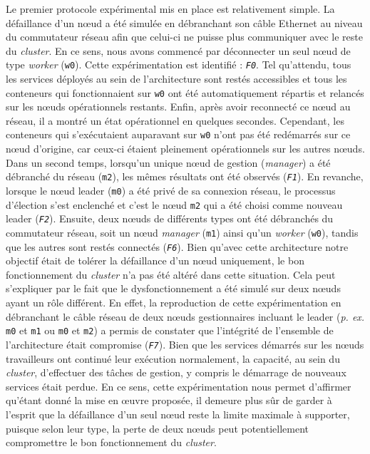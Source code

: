 Le premier protocole expérimental mis en place est relativement simple. La défaillance d'un n\oe{}ud a été simulée en débranchant son câble Ethernet au niveau du commutateur réseau afin que celui-ci ne puisse plus communiquer avec le reste du \textit{cluster}. En ce sens, nous avons commencé par déconnecter un seul n\oe{}ud de type \textit{worker} (\texttt{w0}). Cette expérimentation est identifié : \textit{\texttt{F0}}. Tel qu'attendu, tous les services déployés au sein de l'architecture sont restés accessibles et tous les conteneurs qui fonctionnaient sur \texttt{w0} ont été automatiquement répartis et relancés sur les n\oe{}uds opérationnels restants. Enfin, après avoir reconnecté ce n\oe{}ud au réseau, il a montré un état opérationnel en quelques secondes. Cependant, les conteneurs qui s'exécutaient auparavant sur \texttt{w0} n'ont pas été redémarrés sur ce n\oe{}ud d'origine, car ceux-ci étaient pleinement opérationnels sur les autres n\oe{}uds. Dans un second temps, lorsqu'un unique n\oe{}ud de gestion (\textit{manager}) a été débranché du réseau (\texttt{m2}), les mêmes résultats ont été observés (\textit{\texttt{F1}}). En revanche, lorsque le n\oe{}ud leader (\texttt{m0}) a été privé de sa connexion réseau, le processus d'élection s'est enclenché et c'est le n\oe{}ud \texttt{m2} qui a été choisi comme nouveau leader (\textit{\texttt{F2}}). Ensuite, deux n\oe{}uds de différents types ont été débranchés du commutateur réseau, soit un n\oe{}ud \textit{manager} (\texttt{m1}) ainsi qu'un \textit{worker} (\texttt{w0}), tandis que les autres sont restés connectés (\textit{\texttt{F6}}). Bien qu'avec cette architecture notre objectif était de tolérer la défaillance d'un n\oe{}ud uniquement, le bon fonctionnement du \textit{cluster} n'a pas été altéré dans cette situation. Cela peut s'expliquer par le fait que le dysfonctionnement a été simulé sur deux n\oe{}uds ayant un rôle différent. En effet, la reproduction de cette expérimentation en débranchant le câble réseau de deux n\oe{}uds gestionnaires incluant le leader (\textit{p. ex.} \texttt{m0} et \texttt{m1} ou \texttt{m0} et \texttt{m2}) a permis de constater que l'intégrité de l'ensemble de l'architecture était compromise (\textit{\texttt{F7}}). Bien que les services démarrés sur les n\oe{}uds travailleurs ont continué leur exécution normalement, la capacité, au sein du \textit{cluster}, d'effectuer des tâches de gestion, y compris le démarrage de nouveaux services était perdue. En ce sens, cette expérimentation nous permet d'affirmer qu'étant donné la mise en \oe{}uvre proposée, il demeure plus sûr de garder à l'esprit que la défaillance d'un seul n\oe{}ud reste la limite maximale à supporter, puisque selon leur type, la perte de deux n\oe{}uds peut potentiellement compromettre le bon fonctionnement du \textit{cluster}.

